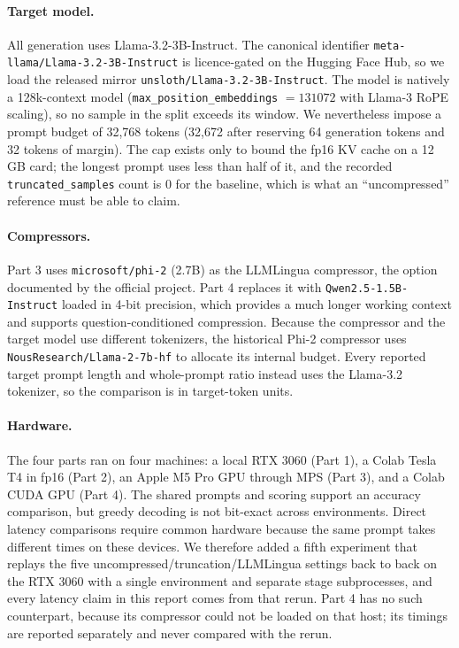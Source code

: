 \documentclass[10pt,a4paper,twocolumn]{article}
\begin{document}
\paragraph{Target model.} All generation uses Llama-3.2-3B-Instruct. The canonical
identifier \texttt{meta-llama/Llama-3.2-3B-Instruct} is licence-gated on the
Hugging Face Hub, so we load the released mirror
\texttt{unsloth/Llama-3.2-3B-Instruct}. The model is natively a 128k-context model
(\texttt{max\_position\_embeddings} $=131072$ with Llama-3 RoPE scaling), so no
sample in the split exceeds its window. We nevertheless impose a prompt budget of
32{,}768 tokens (32{,}672 after reserving 64 generation tokens and 32 tokens of
margin). The cap exists only to bound the fp16 KV cache on a 12\,GB card; the
longest prompt uses less than half of it, and the recorded
\texttt{truncated\_samples} count is 0 for the baseline, which is what an
``uncompressed'' reference must be able to claim.

\paragraph{Compressors.} Part 3 uses \texttt{microsoft/phi-2} (2.7B) as the
LLMLingua compressor, the option documented by the official project. Part 4
replaces it with \texttt{Qwen2.5-1.5B-Instruct} loaded in 4-bit precision, which
provides a much longer working context and supports question-conditioned
compression. Because the compressor and the target model use different tokenizers,
the historical Phi-2 compressor uses \texttt{NousResearch/Llama-2-7b-hf} to allocate its internal budget. Every reported target prompt length and whole-prompt ratio instead uses the Llama-3.2 tokenizer, so the comparison is in target-token units.

\paragraph{Hardware.} The four parts ran on four machines: a local RTX 3060
(Part 1), a Colab Tesla T4 in fp16 (Part 2), an Apple M5 Pro GPU through MPS
(Part 3), and a Colab CUDA GPU (Part 4). The shared prompts and scoring support an accuracy comparison, but greedy decoding is not bit-exact across environments. Direct latency comparisons require common hardware because the same prompt takes different times on these devices. We
therefore added a fifth experiment that replays the five
uncompressed/truncation/LLMLingua settings back to back on the RTX 3060 with a
single environment and separate stage subprocesses, and every latency claim in this report comes from that rerun.
Part 4 has no such counterpart, because its compressor could not be loaded on that
host; its timings are reported separately and never compared with the rerun.
\end{document}
